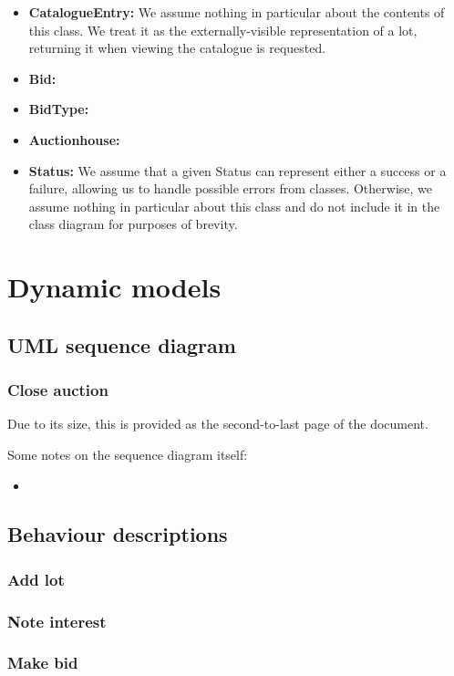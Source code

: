 \documentclass[titlepage, 12pt]{extarticle}
\begin{document}
\begin{itemize}
\begin{enumerate}
  \end{enumerate}
\item {\bf CatalogueEntry: } We assume nothing in particular about the contents of this class. We treat it as the externally-visible representation of a lot, returning it when viewing the catalogue is requested. 
\item {\bf Bid: }
\item {\bf BidType: }
\item {\bf Auctionhouse: }
\item {\bf Status: } We assume that a given Status can represent either a success or a failure, allowing us to handle possible errors from classes. Otherwise, we assume nothing in particular about this class and do not include it in the class diagram for purposes of brevity. 
\end{itemize}
\section{Dynamic models}
\subsection{UML sequence diagram}
\subsubsection{Close auction}
Due to its size, this is provided as the second-to-last page of the document.

\noindent Some notes on the sequence diagram itself:
\begin{itemize}
  \item 
\end{itemize}

\subsection{Behaviour descriptions}
\subsubsection{Add lot}
\subsubsection{Note interest}
\subsubsection{Make bid}



\end{document}
